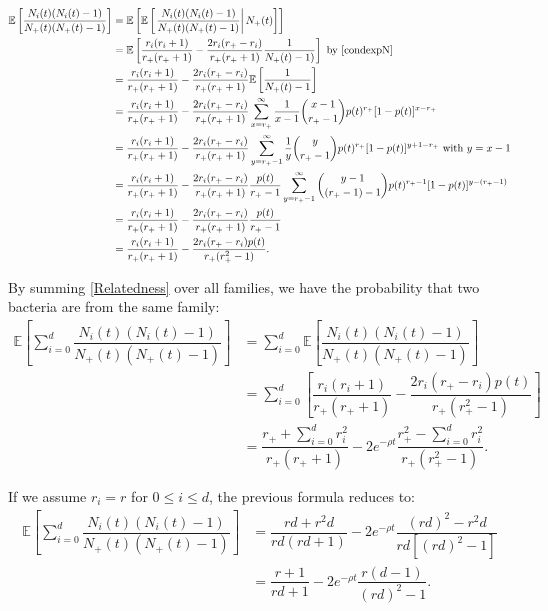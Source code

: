 \documentclass{article}
\begin{document}
\begin{align}
\mathbb{E}\left[ \dfrac{N_i(t)(N_i(t)-1)}{N_+(t) ( N_+(t)-1 )} \right] &= 
 \mathbb{E}\left[ \mathbb{E}\left[ \left. \dfrac{N_i(t)(N_i(t)-1)}{N_+(t)( N_+(t)-1 ) } \right\vert N_+(t) \right] \right]\\
 &=\mathbb{E}\left[\dfrac{r_i(r_i+1)}{r_+ (r_+ +1)}- \dfrac{2 r_i (r_+ -r_{i})}{r_+ (r_+ +1)} \dfrac{1}{N_+(t)-1) } \right] \text{ by \eqref{condexpN}}\\
 &=\dfrac{r_i(r_i+1)}{r_+ (r_+ +1 )}-\dfrac{2 r_i (r_+ -r_{i})}{r_+ (r_+ +1 )}\mathbb{E}\left[\dfrac{1}{N_+(t)-1} \right]\\
 &=\dfrac{r_i(r_i+1)}{r_+ (r_+ +1 )}-\dfrac{2 r_i (r_+ -r_{i})}{r_+ (r_+ +1 )} \sum_{x=r_+}^{\infty } \dfrac{1}{x-1} \binom{x-1}{r_+-1} p(t)^{r_+} [1-p(t)]^{x-r_+} \\
 &=\dfrac{r_i(r_i+1)}{r_+ (r_+ +1 )}-\dfrac{2 r_i (r_+ -r_{i})}{r_+ (r_+ +1 )}\sum_{y=r_+-1}^{\infty} \dfrac{1}{y} \binom{y}{r_+-1} p(t)^{r_+} [1-p(t)]^{y+1-r_+} \text{ with }y=x-1\\
 &=\dfrac{r_i(r_i+1)}{r_+ (r_+ +1 )}-\dfrac{2 r_i (r_+ -r_{i})}{r_+ (r_+ +1 )}\dfrac{p(t)}{r_+-1}\sum_{y=r_+-1}^{\infty}\binom{y-1}{(r_+-1)-1} p(t)^{r_+-1} [1-p(t)]^{y-(r_+-1)} \\
 &=\dfrac{r_i(r_i+1)}{r_+ (r_+ +1 )}-\dfrac{2 r_i (r_+ -r_{i})}{r_+ (r_+ +1 )}\dfrac{p(t)}{r_+-1}\\
 &=\dfrac{r_i(r_i+1)}{r_+ (r_+ +1 )}-\dfrac{2 r_i (r_+ -r_{i})p(t)}{r_+ (r_+^2 -1 )}. \label{Relatedness}
\end{align}

By summing \eqref{Relatedness} over all families, we have the probability that two bacteria are from the same family:
\begin{align}
\mathbb{E}\left[ \displaystyle \sum_{i=0}^d \dfrac{N_i(t)(N_i(t)-1)}{N_+(t)(N_+(t)-1)} \right] &= \displaystyle \sum_{i=0}^d \mathbb{E}\left[  \dfrac{N_i(t)(N_i(t)-1)}{N_+(t)( N_+(t)-1 ) } \right]\\
&= \displaystyle \sum_{i=0}^d \left[ \dfrac{r_i(r_i+1)}{r_+ (r_+ +1 )}-\dfrac{2 r_i (r_+ -r_{i})p(t)}{r_+ (r_+^2 -1 )} \right] \\
&=    \dfrac{ r_+ + \sum_{i=0}^d r_i^2}{r_+ (r_+ +1)}  -2 e^{-\rho t} \dfrac{ r_+^2-\sum_{i=0}^d r_i^2}{r_+ (r_+^2 -1) }.
\end{align}

If we assume $r_i=r$ for $0 \leq i \leq d$, the previous formula reduces to:
\begin{align}
\mathbb{E}\left[ \displaystyle \sum_{i=0}^d \dfrac{N_i(t)(N_i(t)-1)}{N_+(t)\left(N_+(t)-1 \right)} \right] &=
 \dfrac{ rd + r^2 d}{rd (rd +1)}  -2 e^{-\rho t} \dfrac{ (rd)^2-r^2d}{rd [(rd)^2 -1] }\\
 &= \dfrac{r+1}{rd+1}  -2e^{-\rho t} \dfrac{r(d-1)}{(rd)^2 -1 }.
\end{align}
\end{document}
